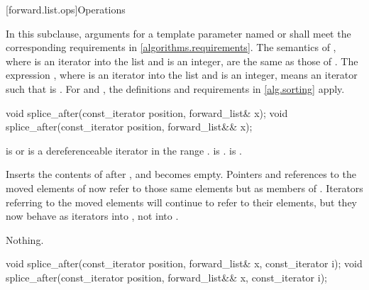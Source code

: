 [forward.list.ops]{Operations}

\pnum
In this subclause,
arguments for a template parameter
named  or 
shall meet the corresponding requirements in \ref{algorithms.requirements}.
The semantics of ,
where  is an iterator into the list and  is an integer,
are the same as those of .
The expression ,
where  is an iterator into the list and  is an integer,
means an iterator  such that  is .
For  and ,
the definitions and requirements in \ref{alg.sorting} apply.

%
\begin{itemdecl}
void splice_after(const_iterator position, forward_list& x);
void splice_after(const_iterator position, forward_list&& x);
\end{itemdecl}

\begin{itemdescr}
\pnum
\expects
{} is  or is a dereferenceable
iterator in the range .
 is .
 is .

\pnum
\effects
Inserts the contents of  after
, and  becomes empty. Pointers and references to the moved
elements of  now refer to those same elements but as members of .
Iterators referring to the moved elements will continue to refer to their elements, but
they now behave as iterators into , not into .

\pnum
\throws
Nothing.

\pnum
\complexity
{}
\end{itemdescr}

%
\begin{itemdecl}
void splice_after(const_iterator position, forward_list& x, const_iterator i);
void splice_after(const_iterator position, forward_list&& x, const_iterator i);
\end{itemdecl}

